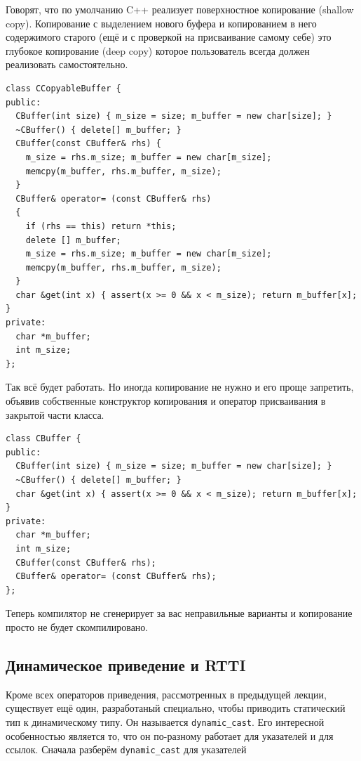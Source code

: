 \documentclass[a4paper,12pt,oneside]{article}
\begin{document}
Говорят, что по умолчанию C++ реализует поверхностное копирование (shallow copy). Копирование с выделением нового буфера и копированием в него содержимого старого (ещё и с проверкой на присваивание самому себе) это глубокое копирование (deep copy) которое пользователь всегда должен реализовать самостоятельно.

\begin{lstlisting}
class CCopyableBuffer {
public:
  CBuffer(int size) { m_size = size; m_buffer = new char[size]; }
  ~CBuffer() { delete[] m_buffer; }
  CBuffer(const CBuffer& rhs) { 
    m_size = rhs.m_size; m_buffer = new char[m_size];
    memcpy(m_buffer, rhs.m_buffer, m_size);
  } 
  CBuffer& operator= (const CBuffer& rhs)
  {
    if (rhs == this) return *this;
    delete [] m_buffer;
    m_size = rhs.m_size; m_buffer = new char[m_size];
    memcpy(m_buffer, rhs.m_buffer, m_size);
  }
  char &get(int x) { assert(x >= 0 && x < m_size); return m_buffer[x]; } 
private:
  char *m_buffer;
  int m_size;
};
\end{lstlisting}

Так всё будет работать. Но иногда копирование не нужно и его проще запретить, объявив собственные конструктор копирования и оператор присваивания в закрытой части класса.

\begin{lstlisting}
class CBuffer {
public:
  CBuffer(int size) { m_size = size; m_buffer = new char[size]; }
  ~CBuffer() { delete[] m_buffer; }
  char &get(int x) { assert(x >= 0 && x < m_size); return m_buffer[x]; } 
private:
  char *m_buffer;
  int m_size;
  CBuffer(const CBuffer& rhs);
  CBuffer& operator= (const CBuffer& rhs);
};
\end{lstlisting}

Теперь компилятор не сгенерирует за вас неправильные варианты и копирование просто не будет скомпилировано.

\subsection{Динамическое приведение и RTTI}

Кроме всех операторов приведения, рассмотренных в предыдущей лекции, существует ещё один, разработаный специально, чтобы приводить статический тип к динамическому типу. Он называется \lstinline!dynamic_cast!. Его интересной особенностью является то, что он по-разному работает для указателей и для ссылок. Сначала разберём \lstinline!dynamic_cast! для указателей
\end{document}

